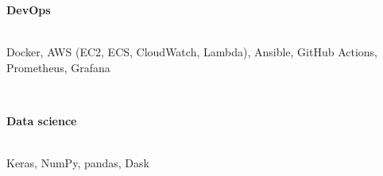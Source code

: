 \documentclass[margin]{res}
\begin{document}
\begin{resume}
\textbf{DevOps}\\
\vspace{-2.5em}\\
\begin{adjustwidth}{5mm}{}
Docker, AWS (EC2, ECS, CloudWatch, Lambda), Ansible, GitHub Actions, Prometheus, Grafana\\
\end{adjustwidth} \\
\vspace{-2em}

\textbf{Data science}\\
\vspace{-2.5em}\\
\begin{adjustwidth}{5mm}{}
Keras, NumPy, pandas, Dask\\
\end{adjustwidth}

\vspace{-1em}


\end{resume}
\end{document}
